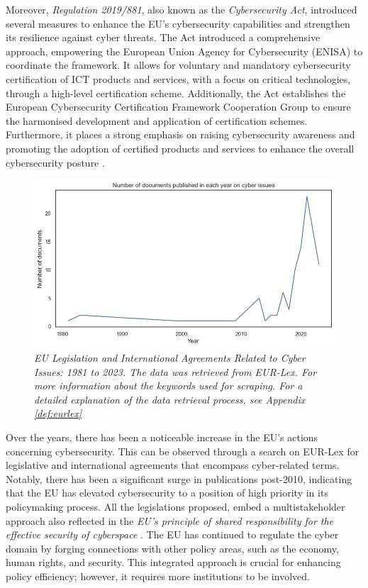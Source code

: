Moreover, \textit{Regulation 2019/881}, also known as the \textit{Cybersecurity Act}, introduced several measures to enhance the EU's cybersecurity capabilities and strengthen its resilience against cyber threats. The Act introduced a comprehensive approach, empowering the European Union Agency for Cybersecurity (ENISA) to coordinate the framework. It allows for voluntary and mandatory cybersecurity certification of ICT products and services, with a focus on critical technologies, through a high-level certification scheme. Additionally, the Act establishes the European Cybersecurity Certification Framework Cooperation Group to ensure the harmonised development and application of certification schemes. Furthermore, it places a strong emphasis on raising cybersecurity awareness and promoting the adoption of certified products and services to enhance the overall cybersecurity posture \autocite{europeanparliament_2019_regulation}. 

\begin{figure}[H]
\centering
\includegraphics[width=1\textwidth]{Images/eurlex.png}
\caption{\textit{EU Legislation and International Agreements Related to Cyber Issues: 1981 to 2023. The data was retrieved from EUR-Lex. For more information about the keywords used for scraping. For a detailed explanation of the data retrieval process, see Appendix \ref{def:eurlex}}}
\label{fig:eurlex.png}
\end{figure}

Over the years, there has been a noticeable increase in the EU's actions concerning cybersecurity. This can be observed through a search on EUR-Lex for legislative and international agreements that encompass cyber-related terms. Notably, there has been a significant surge in publications post-2010, indicating that the EU has elevated cybersecurity to a position of high priority in its policymaking process. All the legislations proposed, embed a multistakeholder approach also reflected in the \textit{EU’s principle of shared responsibility for the effective security of cyberspace} \autocite[6]{christou_2014_the}. The EU has continued to regulate the cyber domain by forging connections with other policy areas, such as the economy, human rights, and security. This integrated approach is crucial for enhancing policy efficiency; however, it requires more institutions to be involved.


